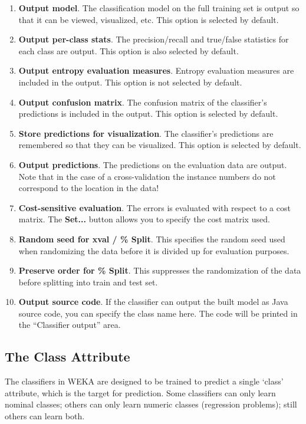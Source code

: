 \documentclass[a4paper]{article}
\begin{document}
\begin{enumerate}
\item \textbf{Output model}.
The classification model on the full training set is output so that it can be
viewed, visualized, etc. This option is selected by default.
\item \textbf{Output per-class stats}.  The precision/recall and
true/false statistics for each class are output. This option is also
selected by default.
\item \textbf{Output entropy evaluation measures}.  Entropy evaluation
measures are included in the output. This option is not selected by
default.
\item \textbf{Output confusion matrix}.
The confusion matrix of the classifier's predictions is included in the output. This option is selected by default.
\item \textbf{Store predictions for visualization}.  The classifier's
predictions are remembered so that they can be visualized. This option
is selected by default.
\item \textbf{Output predictions}. The predictions on the evaluation
data are output.  Note that in the case of a cross-validation the
instance numbers do not correspond to the location in the data!
\item \textbf{Cost-sensitive evaluation}.
The errors is evaluated with respect to a cost matrix. The \textbf{Set...}
button allows you to specify the cost matrix used. 
\item \textbf{Random seed for xval / \% Split}.
This specifies the random seed used when randomizing the data before it is
divided up for evaluation purposes.
\item \textbf{Preserve order for \% Split}.
This suppresses the randomization of the data before splitting into train
and test set.
\item \textbf{Output source code}.
If the classifier can output the built model as Java source code, you can 
specify the class name here. The code will be printed in the ``Classifier 
output'' area.
\end{enumerate}

\subsection{The Class Attribute}

The classifiers in WEKA are designed to be trained to predict a single `class'
attribute, which is the target for prediction. Some classifiers can only learn
nominal classes; others can only learn numeric classes (regression problems);
still others can learn both.
\end{document}
